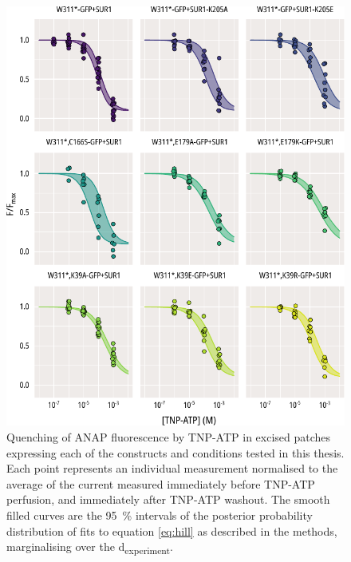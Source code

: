 \begin{figure}[h]
	\centering
	\includegraphics[width=\textwidth]{all_pcf_fits_3.pdf}
	\caption[Excised patch quenching population hill fits]{
	Quenching of ANAP fluorescence by TNP-ATP in excised patches expressing each of the constructs and conditions tested in this thesis.
	Each point represents an individual measurement normalised to the average of the current measured immediately before TNP-ATP perfusion, and immediately after TNP-ATP washout.
	The smooth filled curves are the \SI{95}{\percent} intervals of the posterior probability distribution of fits to equation \ref{eq:hill} as described in the methods, marginalising over the \textgreek{d}\textsubscript{experiment}.
	}
	\label{apxfig:pcf_1}
\end{figure}

